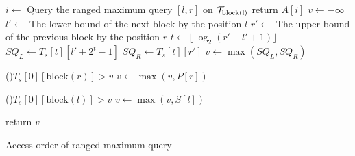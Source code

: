 \begin{algorithm}
\SetAlgoNoLine
{}

 {
  $i \gets$ Query the ranged maximum query $[l, r]$ on ${\cal T}_\text{block(l)}$ \;
  return $A[i]$ \;
}
$v \gets - \infty$ \;
$l' \gets$ The lower bound of the next block by the position $l$ \;
$r' \gets$ The upper bound of the previous block by the position $r$ \;
 {
  $t \gets \lfloor \log_2 (r'-l'+1) \rfloor$ \;
  $SQ_L \gets T_s[t][l' + 2^t - 1]$ \;
  $SQ_R \gets T_s[t][r']$ \;
  $v \gets \max(SQ_L, SQ_R)$ \;
}

\If(){$T_s[0][\text{block}(r)] > v$} {
  $v \gets \max(v, P[r])$ \;
}

\If(){$T_s[0][\text{block}(l)] > v$} {
  $v \gets \max(v, S[l])$ \;
}

return $v$ \;

\caption{Access order of ranged maximum query}
\label{alg:rmq-access-order-2e}
\end{algorithm}

